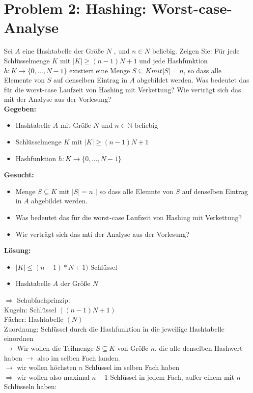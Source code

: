 \section*{{Problem 2: Hashing: Worst-case-Analyse}} 

Sei $A$ eine Hashtabelle der Größe $N$ , und $n \in N$ beliebig. Zeigen Sie: Für jede Schlüsselmenge $K$ mit $|K| \geq (n - 1)N + 1$ und jede Hashfunktion $h : K \rightarrow \{0,\dots, N - 1\}$ existiert eine Menge $S \subseteq K mit |S| = n$, so dass alle Elemente von $S$ auf denselben Eintrag in $A$ abgebildet werden. Was bedeutet das für die worst-case Laufzeit von Hashing mit Verkettung? Wie verträgt sich das mit der Analyse aus der Vorlesung?\\

\noindent
\textbf{Gegeben:}
\begin{itemize}
	\item Hashtabelle $A$ mit Größe $N$ und $n \in \mathbb{N}$ beliebig
	\item Schlüsselmenge $K$ mit $|K| \geq (n-1)N+1$
	\item Hashfunktion $h:K \rightarrow \{0, \dots, N-1\}$
\end{itemize}

\noindent
\textbf{Gesucht:}
\begin{itemize}
	\item Menge $S \subseteq K$ mit $|S| = n$ $|$ so dass alle Elemnte von $S$ auf denselben Eintrag in $A$ abgebildet werden.
	\item Was bedeutet das für die worst-case Laufzeit von Hashing mit Verkettung?
	\item Wie verträgt sich das mti der Analyse aus der Vorlesung?
\end{itemize}

\noindent
\textbf{Lösung:}
\begin{itemize}
	\item $|K| \leq (n-1)*N+1)$ Schlüssel
	\item Hashtabelle $A$ der Größe $N$
\end{itemize}
$\Rightarrow$ Schubfachprinzip:\\
Kugeln: Schlüssel $((n-1)N+1)$\\
Fächer: Hashtabelle $(N)$\\
Zuordnung: Schlüssel durch die Hashfunktion in die jeweilige Hashtabelle einordnen\\

$\rightarrow$ Wir wollen die Teilmenge $S \subseteq K$ von Größe $n$, die alle denselben Hashwert haben $\rightarrow$ also im selben Fach landen.\\
$\rightarrow$ wir wollen höchsten $n$ Schlüssel im selben Fach haben\\
$\Rightarrow$ wir wollen also maximal $n-1$ Schlüssel in jedem Fach, außer einem mit $n$ Schlüsseln haben:\\

